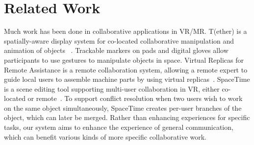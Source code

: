 \documentclass[sigchi-a]{acmart}
\begin{document}
\section{Related Work}
Much work has been done in collaborative applications in VR/MR. T(ether) is a spatially-aware display system for co-located collaborative manipulation and animation of objects ~\cite{lakatos2014t}. Trackable markers on pads and digital gloves allow participants to use gestures to manipulate objects in space. Virtual Replicas for Remote Assistance is a remote collaboration system, allowing a remote expert to guide local users to assemble machine parts by using virtual replicas~\cite{oda2015virtual}.
SpaceTime is a scene editing tool supporting multi-user collaboration in VR, either co-located or remote~\cite{xia2018spacetime}. To support conflict resolution when two users wish to work on the same object simultaneously, SpaceTime creates per-user branches of the object, which can later be merged. 
Rather than enhancing experiences for specific tasks, our system aims to enhance the experience of general communication, which can benefit various kinds of more specific collaborative work.
\end{document}
